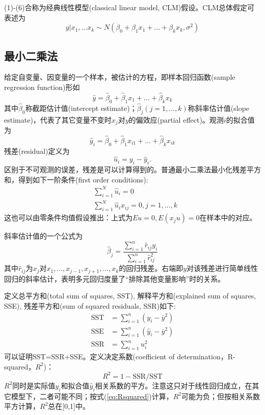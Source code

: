\par (1)-(6)合称为经典线性模型(classical linear model, CLM)假设。CLM总体假定可表述为
\begin{equation}
    y\vert x_1,\dots x_k \sim N(\beta_0+\beta_1x_1+\dots+\beta_kx_k,\sigma^2)
\end{equation}

\subsection{最小二乘法}

\par 给定自变量、因变量的一个样本，被估计的方程，即样本回归函数(sample regression function)形如
\begin{equation}
    \hat{y}=\hat{\beta}_0+\hat{\beta}_1 x_1+\dots+\hat{\beta}_k x_k
\end{equation}
其中$\hat{\beta}_0$称截距估计值(intercept estimate)；$\hat{\beta}_j(j=1,\dots,k)$称斜率估计值(slope estimate)，代表了其它变量不变时$x_j$对$y$的偏效应(partial effect)。观测$i$的拟合值为
\begin{equation}
    \hat{y}_i=\hat{\beta}_0+\hat{\beta}_1 x_{i1}+\dots+\hat{\beta}_k x_{ik}
\end{equation}
残差(residual)定义为
\begin{equation}
    \hat{u}_i = y_i-\hat{y}_i.
\end{equation}
区别于不可观测的误差，残差是可以计算得到的。普通最小二乘法最小化残差平方和，得到如下一阶条件(first order conditions):
\begin{align}
    &\sum_{i=1}^N \hat{u}_i=0\\
    &\sum_{i=1}^N \hat{u}_ix_{ij}=0, j=1,\dots,k
\end{align}
这也可以由零条件均值假设推出：上式为$Eu=0, E(x_ju)=0$在样本中的对应。

\par 斜率估计值的一个公式为
\begin{equation}
    \hat{\beta}_j=\frac{\sum_{i=1}^n \hat{r}_{ij}y_i}{\sum_{i=1}^n \hat{r}_{ij}^2}
\end{equation}
其中$\hat{r}_{ij}$为$x_j$对$x_1,\dots,x_{j-1},x_{j+1},\dots,x_k$的回归残差。右端即$y$对该残差进行简单线性回归的斜率估计，表明多元回归度量了“排除其他变量影响”时的关系。

\par 定义总平方和(total sum of squares, SST), 解释平方和(explained sum of squares, SSE), 残差平方和(sum of squared residuals, SSR)如下:
\begin{align}
    \text{SST}&=\sum_{i=1}^n (y_i-\bar{y}^2)\\
    \text{SSE}&=\sum_{i=1}^n (\hat{y}_i-\bar{y}^2)\\
    \text{SSR}&=\sum_{i=1}^n u_i^2
\end{align}
可以证明SST=SSR+SSE。定义决定系数(coefficient of determination，R-squared，$R^2$)：
\begin{equation}
    R^2=1-\text{SSR}/\text{SST}\label{eq:Rsquared}
\end{equation}
$R^2$同时是实际值$y_i$和拟合值$\hat{y}_i$相关系数的平方。注意这只对于线性回归成立，在其它模型下，二者可能不同；按式(\ref{eq:Rsquared})计算，$R^2$可能为负；但按相关系数平方计算，$R^2$总在[0,1]中。

